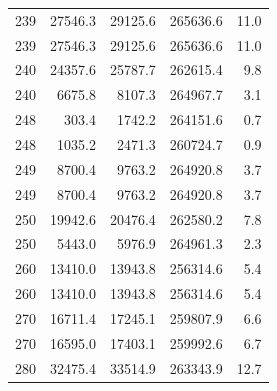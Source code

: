 {\begin{longtable}{rrrrr}
    239 & \num{27546.3} & \num{29125.6} & \num{265636.6} & 11.0 \\
    239 & \num{27546.3} & \num{29125.6} & \num{265636.6} & 11.0 \\
    240 & \num{24357.6} & \num{25787.7} & \num{262615.4} & 9.8 \\
    240 & \num{6675.8} & \num{8107.3} & \num{264967.7} & 3.1 \\
    248 & \num{303.4} & \num{1742.2} & \num{264151.6} & 0.7 \\
    248 & \num{1035.2} & \num{2471.3} & \num{260724.7} & 0.9 \\
    249 & \num{8700.4} & \num{9763.2} & \num{264920.8} & 3.7 \\
    249 & \num{8700.4} & \num{9763.2} & \num{264920.8} & 3.7 \\
    250 & \num{19942.6} & \num{20476.4} & \num{262580.2} & 7.8 \\
    250 & \num{5443.0} & \num{5976.9} & \num{264961.3} & 2.3 \\
    260 & \num{13410.0} & \num{13943.8} & \num{256314.6} & 5.4 \\
    260 & \num{13410.0} & \num{13943.8} & \num{256314.6} & 5.4 \\
    270 & \num{16711.4} & \num{17245.1} & \num{259807.9} & 6.6 \\
    270 & \num{16595.0} & \num{17403.1} & \num{259992.6} & 6.7 \\
    280 & \num{32475.4} & \num{33514.9} & \num{263343.9} & 12.7 \\
\end{longtable}
}

